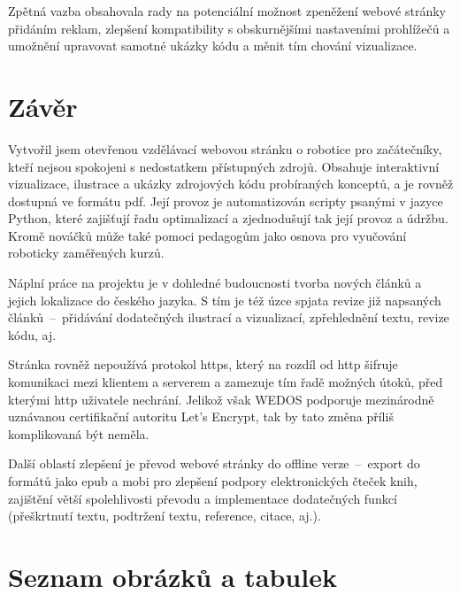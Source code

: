 \documentclass[a4paper, 12pt, twoside]{article}
\makeatletter
\renewcommand\listoffigures{%
    \@mkboth{\MakeUppercase\listfigurename}%
        {\MakeUppercase\listfigurename}%
    \@starttoc{lof}%
}
\renewcommand\listoftables{%
    \@mkboth{\MakeUppercase\listtablename}%
        {\MakeUppercase\listtablename}%
    \@starttoc{lot}%
}
\makeatother
\begin{document}
  Zpětná vazba obsahovala rady na potenciální možnost zpeněžení webové stránky přidáním reklam, zlepšení kompatibility s obskurnějšími nastaveními prohlížečů a umožnění upravovat samotné ukázky kódu a měnit tím chování vizualizace.

  \cleardoublepage

  \section{Závěr}
  Vytvořil jsem otevřenou vzdělávací webovou stránku o robotice pro začátečníky, kteří nejsou spokojeni s nedostatkem přístupných zdrojů. Obsahuje interaktivní vizualizace, ilustrace a ukázky zdrojových kódu probíraných konceptů, a je rovněž dostupná ve formátu \gls{pdf}. Její provoz je automatizován scripty psanými v jazyce Python, které zajišťují řadu optimalizací a zjednodušují tak její provoz a údržbu. Kromě nováčků může také pomoci pedagogům jako osnova pro vyučování roboticky zaměřených kurzů.

  Náplní práce na projektu je v dohledné budoucnosti tvorba nových článků a jejich lokalizace do českého jazyka. S tím je též úzce spjata revize již napsaných článků~--~přidávání dodatečných ilustrací a vizualizací, zpřehlednění textu, revize kódu, aj.

  Stránka rovněž nepoužívá protokol \gls{https}, který na rozdíl od \gls{http} šifruje komunikaci mezi klientem a serverem a zamezuje tím řadě možných útoků, před kterými \gls{http} uživatele nechrání. Jelikož však WEDOS podporuje mezinárodně uznávanou certifikační autoritu Let's Encrypt, tak by tato změna příliš komplikovaná být neměla.

  Další oblastí zlepšení je převod webové stránky do offline verze~--~export do formátů jako \gls{epub} a \gls{mobi} pro zlepšení podpory elektronických čteček knih, zajištění větší spolehlivosti převodu a implementace dodatečných funkcí (přeškrtnutí textu, podtržení textu, reference, citace, aj.).

  \cleardoublepage

  \printbibliography[heading=bibnumbered, title=Použitá literatura]

  \cleardoublepage

  \section{Seznam obrázků a tabulek}
  \listoffigures%
  \vspace{\baselineskip}
  \listoftables%
\end{document}

